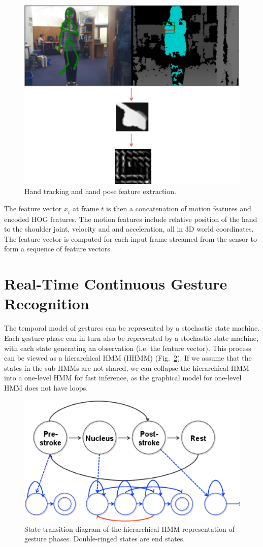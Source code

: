 \documentclass[conference]{IEEEtran}
\begin{document}
\begin{figure}[!t]
\centering
\includegraphics[width=0.8\columnwidth]{fig/hand_tracking.ps}
\caption{Hand tracking and hand pose feature extraction.}
\label{fig:tracking}
\end{figure}

The feature vector $\underline{x}_t$ at frame $t$ is then a concatenation of motion features and encoded HOG features. The
motion features include relative position of the hand to the shoulder joint,
velocity and and acceleration, all in 3D world coordinates. The feature vector
is computed for each input frame streamed from the sensor to form a sequence of
feature vectors.

\section{Real-Time Continuous Gesture Recognition}
The temporal model of gestures can be represented by a stochastic state machine.
Each gesture phase can in turn also be represented by a stochastic state
machine, with each state generating an observation (i.e. the feature vector).
This process can be viewed as a hierarchical HMM (HHMM) (Fig.~\ref{fig:hhmm}). If we assume
that the states in the sub-HMMs are not shared, we can collapse the hierarchical HMM
into a one-level HMM for fast inference, as the graphical model for one-level
HMM does not have loops.

\begin{figure}[!t]
\centering
\includegraphics[width=0.7\columnwidth]{fig/hhmm.ps}
\caption{State transition diagram of the hierarchical HMM representation of
gesture phases. Double-ringed states are end states.}
\label{fig:hhmm}
\end{figure}
\end{document}
